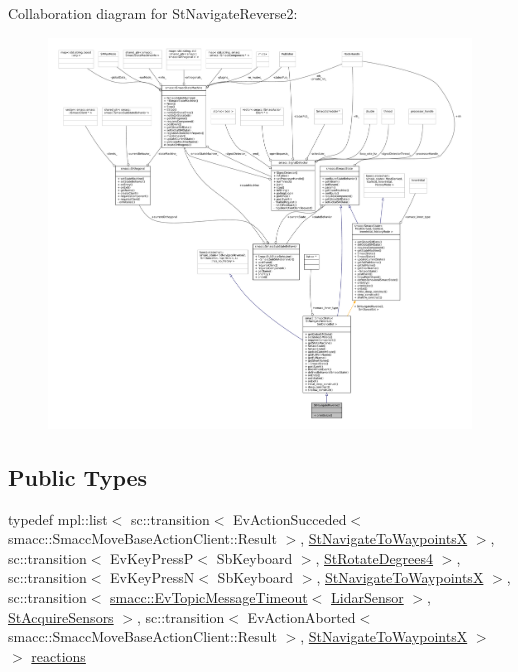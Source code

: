 Collaboration diagram for St\+Navigate\+Reverse2\+:
\nopagebreak
\begin{figure}[H]
\begin{center}
\leavevmode
\includegraphics[width=350pt]{structStNavigateReverse2__coll__graph}
\end{center}
\end{figure}
\subsection*{Public Types}
\begin{DoxyCompactItemize}
\item 
typedef mpl\+::list$<$ sc\+::transition$<$ Ev\+Action\+Succeded$<$ smacc\+::\+Smacc\+Move\+Base\+Action\+Client\+::\+Result $>$, \hyperlink{structStNavigateToWaypointsX}{St\+Navigate\+To\+WaypointsX} $>$, sc\+::transition$<$ Ev\+Key\+PressP$<$ Sb\+Keyboard $>$, \hyperlink{structStRotateDegrees4}{St\+Rotate\+Degrees4} $>$, sc\+::transition$<$ Ev\+Key\+PressN$<$ Sb\+Keyboard $>$, \hyperlink{structStNavigateToWaypointsX}{St\+Navigate\+To\+WaypointsX} $>$, sc\+::transition$<$ \hyperlink{structsmacc_1_1EvTopicMessageTimeout}{smacc\+::\+Ev\+Topic\+Message\+Timeout}$<$ \hyperlink{sensor__state_8h_a9db9e1944f88de79507758d08e4a2ee3}{Lidar\+Sensor} $>$, \hyperlink{structStAcquireSensors}{St\+Acquire\+Sensors} $>$, sc\+::transition$<$ Ev\+Action\+Aborted$<$ smacc\+::\+Smacc\+Move\+Base\+Action\+Client\+::\+Result $>$, \hyperlink{structStNavigateToWaypointsX}{St\+Navigate\+To\+WaypointsX} $>$ $>$ \hyperlink{structStNavigateReverse2_a8cc76155c9ec823276e4546f1ca184ce}{reactions}
\end{DoxyCompactItemize}
